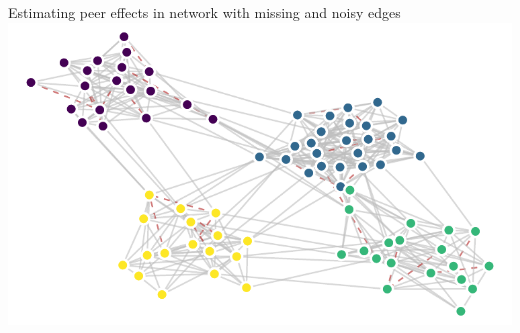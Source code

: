 \documentclass[aspectratio=169]{beamer}
\theoremstyle{remark}
\begin{document}
\begin{frame}{Estimating peer effects in network with missing and noisy edges}
    \centering
    \includegraphics{./figures/missing-edges.pdf}
\end{frame}
\end{document}
